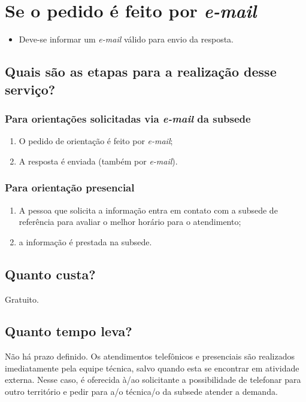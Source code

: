 \chapter{Se o pedido é feito por \emph{e-mail}}

\begin{itemize}
  \item  Deve-se informar um \emph{e-mail} válido para envio da resposta.
\end{itemize}

\section{Quais são as etapas para a realização desse serviço?}

\subsection{Para orientações solicitadas via \emph{e-mail} da subsede}

\begin{enumerate}
  \item  O pedido de orientação é feito por \emph{e-mail};
  \item  A resposta é enviada (também por \emph{e-mail}).
\end{enumerate}

\subsection{Para orientação presencial}

\begin{enumerate}
  \item  A pessoa que solicita a informação entra em contato com a subsede de  referência para avaliar o melhor horário para o atendimento;
  \item  a informação é prestada na subsede.
\end{enumerate}

\section{Quanto custa?}

Gratuito.

\section{Quanto tempo leva?}

Não há prazo definido. Os atendimentos telefônicos e presenciais são realizados imediatamente pela equipe técnica, salvo quando esta se encontrar em atividade externa. Nesse caso, é oferecida à/ao solicitante a possibilidade de telefonar para outro território e pedir para a/o técnica/o da subsede atender a demanda.

